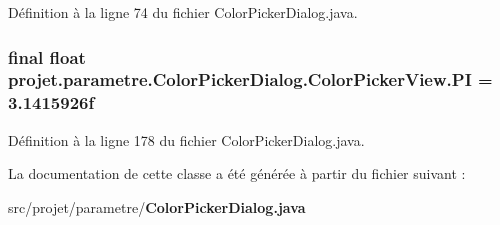 \-Définition à la ligne 74 du fichier \-Color\-Picker\-Dialog.\-java.

\subsubsection[{\-P\-I}]{\setlength{\rightskip}{0pt plus 5cm}final float {\bf projet.\-parametre.\-Color\-Picker\-Dialog.\-Color\-Picker\-View.\-P\-I} = 3.\-1415926f\hspace{0.3cm}{\ttfamily  [static, private]}}\label{classprojet_1_1parametre_1_1_color_picker_dialog_1_1_color_picker_view_a8f18dccaebf66a3d1986f6daee9eaac4}


\-Définition à la ligne 178 du fichier \-Color\-Picker\-Dialog.\-java.



\-La documentation de cette classe a été générée à partir du fichier suivant \-:\begin{DoxyCompactItemize}
\item 
src/projet/parametre/{\bf \-Color\-Picker\-Dialog.\-java}\end{DoxyCompactItemize}
